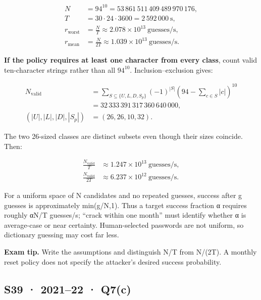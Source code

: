 \documentclass[11pt,a4paper]{article}
\begin{document}
\[
\begin{aligned}N&=94^{10}=53\,861\,511\,409\,489\,970\,176,\\T&=30\cdot24\cdot3600=2\,592\,000\ \mathrm{s},\\r_{\mathrm{worst}}&=\frac{N}{T}\approx2.078\times10^{13}\ \mathrm{guesses/s},\\r_{\mathrm{mean}}&=\frac{N}{2T}\approx1.039\times10^{13}\ \mathrm{guesses/s}.\end{aligned}
\]

\textbf{If the policy requires at least one character from every class},\allowbreak{} count valid ten-character strings rather than all \(94^{10}\). Inclusion–exclusion gives:



\[
\begin{aligned}N_{\mathrm{valid}}&=\sum_{S\subseteq\{U,L,D,S_p\}}(-1)^{|S|}\left(94-\sum_{c\in S}|c|\right)^{10}\\&=32\,333\,391\,317\,360\,640\,000,\\(|U|,|L|,|D|,|S_p|)&=(26,26,10,32).\end{aligned}
\]

The two 26-sized classes are distinct subsets even though their sizes coincide. Then:



\[
\begin{aligned}\frac{N_{\mathrm{valid}}}{T}&\approx1.247\times10^{13}\ \mathrm{guesses/s},\\\frac{N_{\mathrm{valid}}}{2T}&\approx6.237\times10^{12}\ \mathrm{guesses/s}.\end{aligned}
\]

For a uniform space of N candidates and no repeated guesses,\allowbreak{} success after g guesses is approximately min(g/\allowbreak{}N,\allowbreak{}1). Thus a target success fraction α requires roughly αN/\allowbreak{}T guesses/\allowbreak{}s; “crack within one month” must identify whether α is average-case or near certainty. Human-selected passwords are not uniform,\allowbreak{} so dictionary guessing may cost far less.



{\color{ForestGreen}\textbf{Exam tip.} Write the assumptions and distinguish N/\allowbreak{}T from N/\allowbreak{}(2T). A monthly reset policy does not specify the attacker’s desired success probability.}




\clearpage
\subsection{S39 · 2021–22 · Q7(c)}\label{s39}
\end{document}
